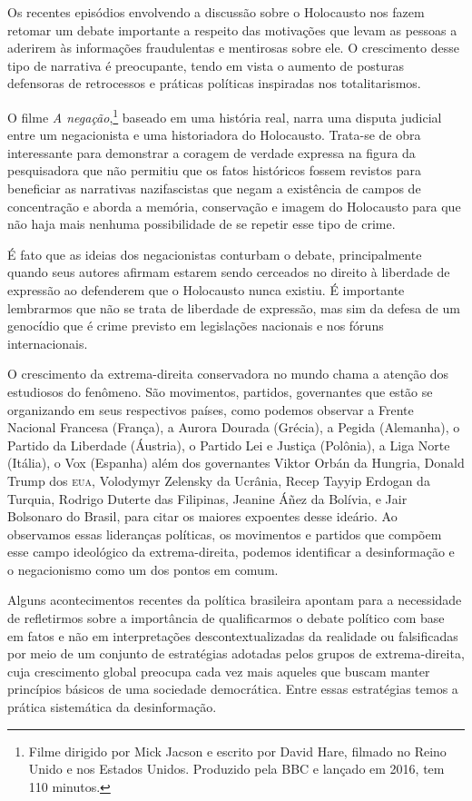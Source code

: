 Os recentes episódios envolvendo a discussão sobre o Holocausto nos
fazem retomar um debate importante a respeito das motivações que levam
as pessoas a aderirem às informações fraudulentas e mentirosas sobre
ele. O crescimento desse tipo de narrativa é preocupante, tendo em vista
o aumento de posturas defensoras de retrocessos e práticas políticas
inspiradas nos totalitarismos.

O filme \textit{A negação},\footnote{Filme dirigido por Mick Jacson e
  escrito por David Hare, filmado no Reino Unido e nos Estados Unidos. Produzido pela BBC e lançado em 2016, tem 110 minutos.} baseado em uma história real, narra uma
disputa judicial entre um negacionista e uma historiadora do Holocausto.
Trata-se de obra interessante para demonstrar a coragem de verdade
expressa na figura da pesquisadora que não permitiu que os fatos
históricos fossem revistos para beneficiar as narrativas nazifascistas
que negam a existência de campos de concentração e aborda a memória,
conservação e imagem do Holocausto para que não haja mais nenhuma
possibilidade de se repetir esse tipo de crime.

É fato que as ideias dos negacionistas conturbam o debate,
principalmente quando seus autores afirmam estarem sendo cerceados no
direito à liberdade de expressão ao defenderem que o Holocausto nunca
existiu. É importante lembrarmos que não se trata de liberdade de
expressão, mas sim da defesa de um genocídio que é crime previsto em
legislações nacionais e nos fóruns internacionais.

O crescimento da extrema-direita conservadora no mundo chama a atenção
dos estudiosos do fenômeno. São movimentos, partidos, governantes que
estão se organizando em seus respectivos países, como podemos observar a
Frente Nacional Francesa (França), a Aurora Dourada (Grécia), a Pegida
(Alemanha), o Partido da Liberdade (Áustria), o Partido Lei e Justiça
(Polônia), a Liga Norte (Itália), o Vox (Espanha) além dos governantes
Viktor Orbán da Hungria, Donald Trump dos \textsc{eua},
Volodymyr Zelensky da Ucrânia, Recep Tayyip Erdogan da Turquia, Rodrigo Duterte
das Filipinas, Jeanine Áñez da Bolívia, e Jair
Bolsonaro do Brasil, para citar os maiores expoentes desse ideário. Ao
observamos essas lideranças políticas, os movimentos e partidos que
compõem esse campo ideológico da extrema-direita, podemos identificar a
desinformação e o negacionismo como um dos pontos em comum.

Alguns acontecimentos recentes da política brasileira apontam para a
necessidade de refletirmos sobre a importância de qualificarmos o debate
político com base em fatos e não em interpretações descontextualizadas
da realidade ou falsificadas por meio de um conjunto de estratégias
adotadas pelos grupos de extrema-direita, cuja crescimento global
preocupa cada vez mais aqueles que buscam manter princípios básicos de
uma sociedade democrática. Entre essas estratégias temos a prática
sistemática da desinformação.

